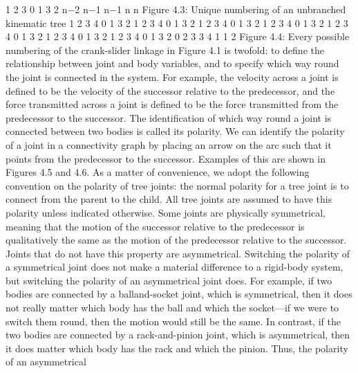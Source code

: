 1 2 3 0 1 3 2 n−2 n−1 n−1 n n Figure 4.3: Unique numbering of an unbranched kinematic tree 1 2 3 4 0 1 3 2 1 2 3 4 0 1 3 2 1 2 3 4 0 1 3 2 1 2 3 4 0 1 3 2 1 2 3 4 0 1 3 2 1 2 3 4 0 1 3 2 1 2 3 4 0 1 3 2 0 2 3 3 4 1 1 2 Figure 4.4: Every possible numbering of the crank-slider linkage in Figure 4.1 is twofold: to define the relationship between joint and body variables, and to specify which way round the joint is connected in the system. For example, the velocity across a joint is defined to be the velocity of the successor relative to the predecessor, and the force transmitted across a joint is defined to be the force transmitted from the predecessor to the successor. The identification of which way round a joint is connected between two bodies is called its polarity. We can identify the polarity of a joint in a connectivity graph by placing an arrow on the arc such that it points from the predecessor to the successor. Examples of this are shown in Figures 4.5 and 4.6. As a matter of convenience, we adopt the following convention on the polarity of tree joints: the normal polarity for a tree joint is to connect from the parent to the child. All tree joints are assumed to have this polarity unless indicated otherwise. Some joints are physically symmetrical, meaning that the motion of the successor relative to the predecessor is qualitatively the same as the motion of the predecessor relative to the successor. Joints that do not have this property are asymmetrical. Switching the polarity of a symmetrical joint does not make a material difference to a rigid-body system, but switching the polarity of an asymmetrical joint does. For example, if two bodies are connected by a balland-socket joint, which is symmetrical, then it does not really matter which body has the ball and which the socket—if we were to switch them round, then the motion would still be the same. In contrast, if the two bodies are connected by a rack-and-pinion joint, which is asymmetrical, then it does matter which body has the rack and which the pinion. Thus, the polarity of an asymmetrical

